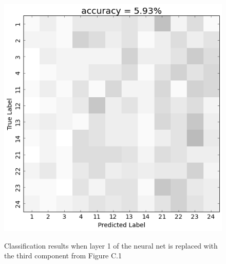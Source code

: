 \begin{figure}[h] 
  \begin{center}
    \includegraphics[scale=0.5]{Figures/PC2_confusion}
   \\\vspace{-0.8em}
    \caption{Classification results when layer 1 of the neural net is replaced with the third component from Figure C.1}
    \label{fig:PC2_confusion}
  \end{center}
  \vspace{-1em}
\end{figure}

